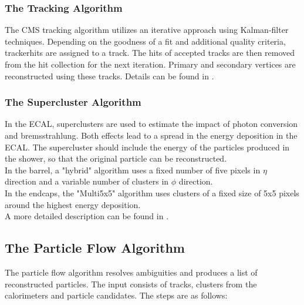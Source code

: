 \subsubsection{The Tracking Algorithm}

The CMS tracking algorithm utilizes an iterative approach using Kalman-filter \cite{Fruhwirth:1987fm} techniques. Depending on the goodness of a fit and additional quality criteria, trackerhits are assigned to a track. The hits of accepted tracks are then removed from the hit collection for the next iteration. Primary and secondary vertices are reconstructed using these tracks. Details can be found in \cite{Adam:934067}.

\subsubsection{The Supercluster Algorithm}
\label{sec_reco_supcl}

In the ECAL, superclusters are used to estimate the impact of photon conversion and bremsstrahlung. Both effects lead to a spread in the energy deposition in the ECAL. The supercluster should include the energy of the particles produced in the shower, so that the original particle can be reconstructed. \\
In the barrel, a "hybrid" algorithm uses a fixed number of five pixels in $\eta$ direction and a variable number of clusters in $\phi$ direction.\\
In the endcaps, the "Multi5x5" algorithm uses clusters of a fixed size of 5x5 pixels around the highest energy deposition. \\
A more detailed description can be found in \cite{cmsTDR1}.

\subsection{The Particle Flow Algorithm}

The particle flow algorithm \cite{CMS-PAS-PFT-09-001} resolves ambiguities and produces a list of reconstructed particles. The input consists of tracks, clusters from the calorimeters and particle candidates. The steps are as follows:


